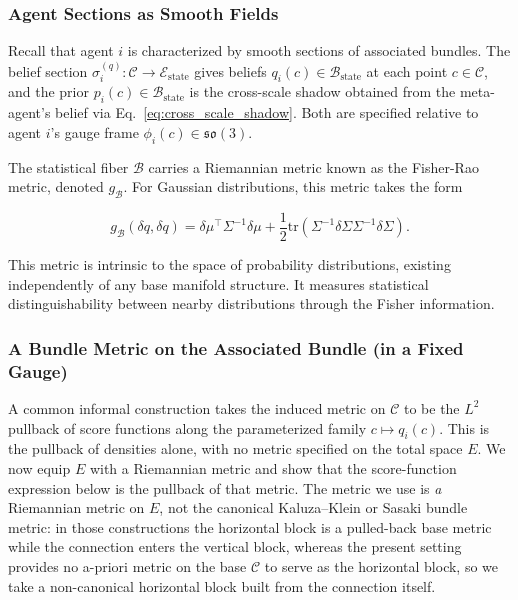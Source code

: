 \documentclass[11pt]{article}
\begin{document}
\subsubsection{Agent Sections as Smooth Fields}

Recall that agent $i$ is characterized by smooth sections of associated bundles. The belief section $\sigma_i^{(q)}: \mathcal{C} \to \mathcal{E}_{\mathrm{state}}$ gives beliefs $q_i(c) \in \mathcal{B}_{\mathrm{state}}$ at each point $c \in \mathcal{C}$, and the prior $p_i(c) \in \mathcal{B}_{\mathrm{state}}$ is the cross-scale shadow obtained from the meta-agent's belief via Eq.~\eqref{eq:cross_scale_shadow}. Both are specified relative to agent $i$'s gauge frame $\phi_i(c) \in \mathfrak{so}(3)$.

The statistical fiber $\mathcal{B}$ carries a Riemannian metric known as the Fisher-Rao metric, denoted $g_{\mathcal{B}}$. For Gaussian distributions, this metric takes the form

\begin{equation}
g_{\mathcal{B}}(\delta q, \delta q) = \delta\mu^\top \Sigma^{-1} \delta\mu + \frac{1}{2}\mathrm{tr}(\Sigma^{-1}\delta\Sigma\Sigma^{-1}\delta\Sigma).
\end{equation}

This metric is intrinsic to the space of probability distributions, existing independently of any base manifold structure. It measures statistical distinguishability between nearby distributions through the Fisher information.

\subsubsection{A Bundle Metric on the Associated Bundle (in a Fixed Gauge)}

A common informal construction takes the induced metric on $\mathcal{C}$ to be the $L^2$ pullback of score functions along the parameterized family $c \mapsto q_i(c)$. This is the pullback of densities alone, with no metric specified on the total space $E$. We now equip $E$ with a Riemannian metric and show that the score-function expression below is the pullback of that metric. The metric we use is \emph{a} Riemannian metric on $E$, not the canonical Kaluza--Klein or Sasaki bundle metric: in those constructions the horizontal block is a pulled-back base metric while the connection enters the vertical block, whereas the present setting provides no a-priori metric on the base $\mathcal{C}$ to serve as the horizontal block, so we take a non-canonical horizontal block built from the connection itself.
\end{document}
